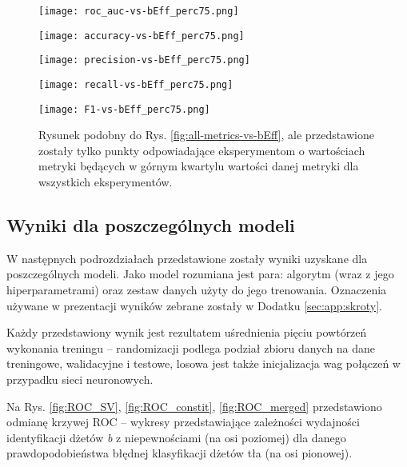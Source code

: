 \begin{figure}[h]
	\centering
	\texttt{[image: roc\_auc-vs-bEff\_perc75.png]} 
	
	\vspace{-1.5em}
	\texttt{[image: accuracy-vs-bEff\_perc75.png]}
	
	\vspace{-1.5em}
	\texttt{[image: precision-vs-bEff\_perc75.png]}
	
	\vspace{-1.5em}
	\texttt{[image: recall-vs-bEff\_perc75.png]}
	
	\vspace{-1.2em}
	\texttt{[image: F1-vs-bEff\_perc75.png]}
	
	\caption{Rysunek podobny do Rys. \ref{fig:all-metrics-vs-bEff}, ale przedstawione zostały tylko punkty odpowiadające eksperymentom o wartościach metryki będących w górnym kwartylu wartości danej metryki dla wszystkich eksperymentów.}
	\label{fig:all-metrics-vs-bEff_perc75}
\end{figure}


\clearpage
\FloatBarrier
\subsection{Wyniki dla poszczególnych modeli}

W następnych podrozdziałach przedstawione zostały wyniki uzyskane dla poszczególnych modeli. Jako model rozumiana jest para: algorytm (wraz z jego hiperparametrami) oraz zestaw danych użyty do jego trenowania. Oznaczenia używane w prezentacji wyników zebrane zostały w Dodatku \ref{sec:app:skroty}. 

Każdy przedstawiony wynik jest rezultatem uśrednienia pięciu powtórzeń wykonania treningu -- randomizacji podlega podział zbioru danych na dane treningowe, walidacyjne i testowe, losowa jest także inicjalizacja wag połączeń w przypadku sieci neuronowych.

Na Rys. \ref{fig:ROC_SV}, \ref{fig:ROC_constit}, \ref{fig:ROC_merged} przedstawiono odmianę krzywej ROC -- wykresy przedstawiające zależności wydajności identyfikacji dżetów \textit{b} z niepewnościami (na osi poziomej) dla danego prawdopodobieństwa błędnej klasyfikacji dżetów tła (na osi pionowej). 

